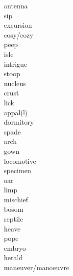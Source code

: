 \documentclass[a4paper, 11pt]{ctexart}
\begin{document}
\begin{multicols*}{3}
\begin{description}
\item[antenna]

\item[sip]

\item[excursion]

\item[cosy/cozy]

\item[peep]

\item[isle]

\item[intrigue]

\item[stoop]

\item[nucleus]

\item[crust]

\item[lick]

\item[appal(l)]

\item[dormitory]

\item[spade]

\item[arch]

\item[gown]

\item[locomotive]

\item[specimen]

\item[oar]

\item[limp]

\item[mischief]

\item[bosom]

\item[reptile]

\item[heave]

\item[pope]

\item[embryo]

\item[herald]

\item[maneuver/manoeuvre]


\end{description}
\end{multicols*}
\end{document}
